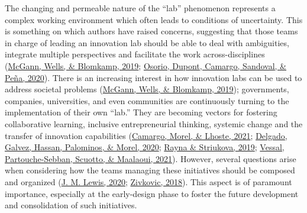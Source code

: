 \documentclass[]{elsarticle} %
\begin{document}
The changing and permeable nature of the ``lab'' phenomenon represents a
complex working environment which often leads to conditions of
uncertainty. This is something on which authors have raised concerns,
suggesting that those teams in charge of leading an innovation lab
should be able to deal with ambiguities, integrate multiple perspectives
and facilitate the work across-disciplines
(\protect\hyperlink{ref-McGann2019}{McGann, Wells, \& Blomkamp, 2019};
\protect\hyperlink{ref-Osorio2020}{Osorio, Dupont, Camargo, Sandoval, \&
Peña, 2020}). There is an increasing interest in how innovation labs can
be used to address societal problems
(\protect\hyperlink{ref-McGann2019}{McGann, Wells, \& Blomkamp, 2019});
governments, companies, universities, and even communities are
continuously turning to the implementation of their own ``lab.'' They
are becoming vectors for fostering collaborative learning, inclusive
entrepreneurial thinking, systemic change and the transfer of innovation
capabilities (\protect\hyperlink{ref-Camargo2021}{Camargo, Morel, \&
Lhoste, 2021}; \protect\hyperlink{ref-Delgado2020}{Delgado, Galvez,
Hassan, Palominos, \& Morel, 2020};
\protect\hyperlink{ref-Rayna2019}{Rayna \& Striukova, 2019};
\protect\hyperlink{ref-RezaeeVessal2021}{Vessal, Partouche-Sebban,
Scuotto, \& Maalaoui, 2021}). However, several questions arise when
considering how the teams managing these initiatives should be composed
and organized (\protect\hyperlink{ref-Lewis2020}{J. M. Lewis, 2020};
\protect\hyperlink{ref-Zivkovic2018}{Zivkovic, 2018}). This aspect is of
paramount importance, especially at the early-design phase to foster the
future development and consolidation of such initiatives.
\end{document}
